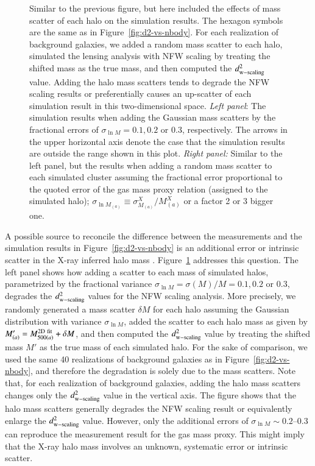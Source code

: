 \documentclass[iop, apj]{emulateapj}
\newcommand{\?}{\stackrel{?}{=}}
\begin{document}
\begin{figure*}
%
%
  \caption{Similar to the previous figure, but here included the effects
 of mass scatter of each halo on the simulation results. The hexagon
 symbols are the same as in Figure~\ref{fig:d2-vs-nbody}. For each
 realization of background galaxies, we added a random mass scatter to
 each halo, simulated the lensing analysis with NFW scaling by treating
 the shifted mass as the true mass, and then computed the $d^2_{\rm
 w-scaling}$ value. Adding the halo mass scatters tends to degrade the
 NFW scaling results or preferentially causes an up-scatter of each
 simulation result in this two-dimensional space. {\it Left panel}: The
 simulation results when adding the Gaussian mass scatters by the
 fractional errors of $\sigma_{\ln M}=0.1, 0.2$ or 0.3,
 respectively. The arrows in the upper horizontal axis denote the case
 that the simulation results are outside the range shown in this plot.
 {\it Right panel:} Similar to the left panel, but the results when
 adding a random mass scatter to each simulated cluster assuming the
 fractional error proportional to the quoted error of the gas mass proxy
 relation (assigned to the simulated halo); $\sigma_{\ln M_{(a)}}\equiv
 \sigma^X_{M_{(a)}}/M_{(a)}^X$ or a factor 2 or 3 bigger
 one. \label{fig:d2-vs-nbody_Merrors}}
\end{figure*}
%
A possible source to reconcile the difference between the measurements
and the simulation results in Figure~\ref{fig:d2-vs-nbody} is an
additional error or intrinsic scatter in the X-ray inferred halo mass
\citep{Staneketal:10,Okabeetal:10b}.
Figure~\ref{fig:d2-vs-nbody_Merrors} addresses this question. The left
panel shows how adding a scatter to each mass of simulated halos,
parametrized by the fractional variance $\sigma_{\ln M}=\sigma(M)/M=0.1,
0.2$ or 0.3, degrades the $d_{\rm w-scaling}^2$ values for the NFW
scaling analysis. More precisely, we randomly generated a mass scatter
$\delta M$ for each halo assuming the Gaussian distribution with
variance $\sigma_{\ln M}$, added the scatter to each halo mass as given
by $M^\prime_{(a)}=M^{\rm{2D~ fit}}_{500(a)}+\delta M$, and then
computed the $d^2_{\rm w-scaling}$ value by treating the shifted mass
$M'$ as the true mass of each simulated halo. For the sake of
comparison, we used the same 40 realizations of background galaxies as
in Figure~\ref{fig:d2-vs-nbody}, and therefore the degradation is solely
due to the mass scatters. Note that, for each realization of background
galaxies, adding the halo mass scatters changes only the $d^2_{\rm
w-scaling}$ value in the vertical axis.
The figure shows that the halo mass scatters generally degrades the NFW
scaling result or equivalently enlarge the $d^2_{\rm w-scaling}$
value. However, only the additional errors of $\sigma_{\ln M}\sim
0.2$--$0.3$ can reproduce the measurement result for the gas mass
proxy.
This might imply that
the X-ray halo mass involves an unknown, systematic error or intrinsic
scatter.
\end{document}
